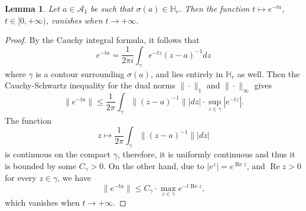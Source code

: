 \documentclass{article}
\newtheorem{lemma}{Lemma}[section]
\theoremstyle{definition}
\renewcommand{\Re}{\operatorname{Re}}
\def\A{{\mathcal{A}}}
\def\HR{\mathbb{H}_r}
\begin{document}
\begin{lemma}\label{expa} Let $a\in\A_1$ be such that $\sigma(a)\in\HR$. Then the function $t\mapsto e^{-ta}$, $t\in[0,+\infty)$, vanishes when $t\to+\infty$.
\end{lemma}
\begin{proof}
By the Cauchy integral formula, it follows that
$$e^{-ta}=\frac{1}{2 \pi i}\int_{\gamma} e^{-tz}(z-a)^{-1}dz$$
where $\gamma$ is a contour surrounding $\sigma(a)$, and lies entirely in $\HR $ as well. Then the Cauchy-Schwartz inequality for the dual norms $\|\cdot\|_1$ and $\|\cdot\|_\infty$ gives
$$\|e^{-ta}\|\leq\frac{1}{2\pi}\int_{\gamma}\|(z-a)^{-1}\||dz|\cdot \sup_{z\in\gamma}\left|e^{-tz}\right|.$$
The function 
$$z\mapsto \frac{1}{2\pi}\int_{\gamma}\|(z-a)^{-1}\||dz|$$
is continuous on the compact $\gamma$, therefore, it is uniformly continuous and thus it is bounded by some $C_\gamma>0$. On the other hand, due to $\left|e^{z}\right|=e^{\Re z}$, and $\Re z>0$ for every $z\in\gamma$, we have
$$\|e^{-ta}\|\leq C_\gamma \cdot \max_{z\in \gamma}e^{-t \Re z},$$
which vanishes when $t\to+\infty$.
\end{proof}
\end{document}
